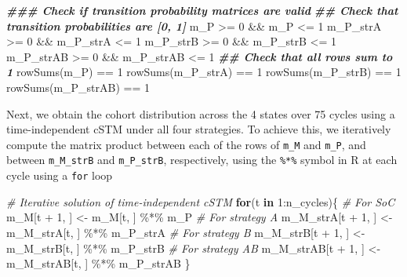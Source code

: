 \documentclass[
]{article}
\newenvironment{Shaded}{\begin{snugshade}}{\end{snugshade}}
\newcommand{\CommentTok}[1]{\textcolor[rgb]{0.56,0.35,0.01}{\textit{#1}}}
\newcommand{\ControlFlowTok}[1]{\textcolor[rgb]{0.13,0.29,0.53}{\textbf{#1}}}
\newcommand{\DecValTok}[1]{\textcolor[rgb]{0.00,0.00,0.81}{#1}}
\newcommand{\DocumentationTok}[1]{\textcolor[rgb]{0.56,0.35,0.01}{\textbf{\textit{#1}}}}
\newcommand{\FunctionTok}[1]{\textcolor[rgb]{0.00,0.00,0.00}{#1}}
\newcommand{\NormalTok}[1]{#1}
\newcommand{\OtherTok}[1]{\textcolor[rgb]{0.56,0.35,0.01}{#1}}
\newcommand{\SpecialCharTok}[1]{\textcolor[rgb]{0.00,0.00,0.00}{#1}}
\begin{document}
\begin{Shaded}
\begin{Highlighting}[]
\DocumentationTok{\#\#\# Check if transition probability matrices are valid}
\DocumentationTok{\#\# Check that transition probabilities are [0, 1]}
\NormalTok{m\_P }\SpecialCharTok{\textgreater{}=} \DecValTok{0} \SpecialCharTok{\&\&}\NormalTok{ m\_P }\SpecialCharTok{\textless{}=} \DecValTok{1}
\NormalTok{m\_P\_strA }\SpecialCharTok{\textgreater{}=} \DecValTok{0} \SpecialCharTok{\&\&}\NormalTok{ m\_P\_strA }\SpecialCharTok{\textless{}=} \DecValTok{1}
\NormalTok{m\_P\_strB }\SpecialCharTok{\textgreater{}=} \DecValTok{0} \SpecialCharTok{\&\&}\NormalTok{ m\_P\_strB }\SpecialCharTok{\textless{}=} \DecValTok{1}
\NormalTok{m\_P\_strAB }\SpecialCharTok{\textgreater{}=} \DecValTok{0} \SpecialCharTok{\&\&}\NormalTok{ m\_P\_strAB }\SpecialCharTok{\textless{}=} \DecValTok{1}
\DocumentationTok{\#\# Check that all rows sum to 1}
\FunctionTok{rowSums}\NormalTok{(m\_P) }\SpecialCharTok{==} \DecValTok{1}
\FunctionTok{rowSums}\NormalTok{(m\_P\_strA) }\SpecialCharTok{==} \DecValTok{1}
\FunctionTok{rowSums}\NormalTok{(m\_P\_strB) }\SpecialCharTok{==} \DecValTok{1}
\FunctionTok{rowSums}\NormalTok{(m\_P\_strAB) }\SpecialCharTok{==} \DecValTok{1}
\end{Highlighting}
\end{Shaded}

Next, we obtain the cohort distribution across the 4 states over 75 cycles using a time-independent cSTM under all four strategies. To achieve this, we iteratively compute the matrix product between each of the rows of \texttt{m\_M} and \texttt{m\_P}, and between \texttt{m\_M\_strB} and \texttt{m\_P\_strB}, respectively, using the \texttt{\%*\%} symbol in R at each cycle using a \texttt{for} loop

\begin{Shaded}
\begin{Highlighting}[]
\CommentTok{\# Iterative solution of time{-}independent cSTM}
\ControlFlowTok{for}\NormalTok{(t }\ControlFlowTok{in} \DecValTok{1}\SpecialCharTok{:}\NormalTok{n\_cycles)\{}
  \CommentTok{\# For SoC}
\NormalTok{  m\_M[t }\SpecialCharTok{+} \DecValTok{1}\NormalTok{, ] }\OtherTok{\textless{}{-}}\NormalTok{ m\_M[t, ] }\SpecialCharTok{\%*\%}\NormalTok{ m\_P}
  \CommentTok{\# For strategy A}
\NormalTok{  m\_M\_strA[t }\SpecialCharTok{+} \DecValTok{1}\NormalTok{, ] }\OtherTok{\textless{}{-}}\NormalTok{ m\_M\_strA[t, ] }\SpecialCharTok{\%*\%}\NormalTok{ m\_P\_strA}
  \CommentTok{\# For strategy B}
\NormalTok{  m\_M\_strB[t }\SpecialCharTok{+} \DecValTok{1}\NormalTok{, ] }\OtherTok{\textless{}{-}}\NormalTok{ m\_M\_strB[t, ] }\SpecialCharTok{\%*\%}\NormalTok{ m\_P\_strB}
  \CommentTok{\# For strategy AB}
\NormalTok{  m\_M\_strAB[t }\SpecialCharTok{+} \DecValTok{1}\NormalTok{, ] }\OtherTok{\textless{}{-}}\NormalTok{ m\_M\_strAB[t, ] }\SpecialCharTok{\%*\%}\NormalTok{ m\_P\_strAB}
\NormalTok{\}}
\end{Highlighting}
\end{Shaded}
\end{document}
